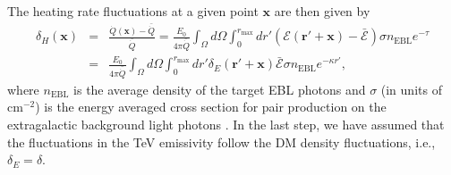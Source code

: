 \documentclass[twocolumns]{emulateapj}
\begin{document}
%
The heating rate fluctuations at a given point $\mathbf{x}$ are then given by 
\begin{eqnarray}
  \label{eq:heat_fluc_newt0}
  \delta_H(\mathbf{x})&=&\frac{\dot{Q}(\mathbf{x})-\bar{\dot{Q}}}{\bar{\dot{Q}}}=
  \frac{E_0}{4\pi\bar{\dot{Q}}} \int_{\Omega}d\Omega\int_0^{r_{\mathrm{max}}} dr' 
  (\mathcal{E}(\mathbf{r}'+\mathbf{x})-\bar{\mathcal{E}}) \sigma n_{\mathrm{EBL}} e^{-\tau} \nonumber\\
  &=&\frac{E_0}{4\pi\bar{\dot{Q}}}\int_{\Omega}d\Omega\int_0^{r_{\mathrm{max}}} dr' \delta_E(\mathbf{r}'+\mathbf{x})\bar{\mathcal{E}}\sigma n_{\mathrm{EBL}} e^{-\kappa r'},
\end{eqnarray}
where $n_{\mathrm{EBL}}$ is the average density of the target EBL photons and $\sigma$ (in units of cm$^{-2}$) is the energy averaged cross section for pair production on the extragalactic background light photons \citep{1967PhRv..155.1408G}. In the last step, we have assumed that the fluctuations in the TeV emissivity follow the DM density fluctuations, i.e., $\delta_E=\delta$.
\end{document}
